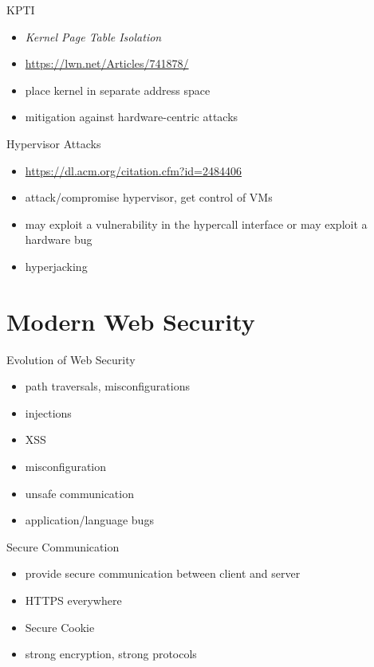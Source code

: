 \documentclass{curs}
\begin{document}
\begin{frame}{KPTI}
  \begin{itemize}
    \pause \item \textit{Kernel Page Table Isolation}
    \pause \item \url{https://lwn.net/Articles/741878/}
    \pause \item place kernel in separate address space
    \pause \item mitigation against hardware-centric attacks
  \end{itemize}
\end{frame}

\begin{frame}{Hypervisor Attacks}
  \begin{itemize}
    \pause \item \url{https://dl.acm.org/citation.cfm?id=2484406}
    \pause \item attack/compromise hypervisor, get control of VMs
    \pause \item may exploit a vulnerability in the hypercall interface or may exploit a hardware bug
    \pause \item hyperjacking
  \end{itemize}
\end{frame}

\section{Modern Web Security}

\begin{frame}{Evolution of Web Security}
  \begin{itemize}
    \pause \item path traversals, misconfigurations
    \pause \item injections
    \pause \item XSS
    \pause \item misconfiguration
    \pause \item unsafe communication
    \pause \item application/language bugs
  \end{itemize}
\end{frame}

\begin{frame}{Secure Communication}
  \begin{itemize}
    \pause \item provide secure communication between client and server
    \pause \item HTTPS everywhere
    \pause \item Secure Cookie
    \pause \item strong encryption, strong protocols
  \end{itemize}
\end{frame}
\end{document}
